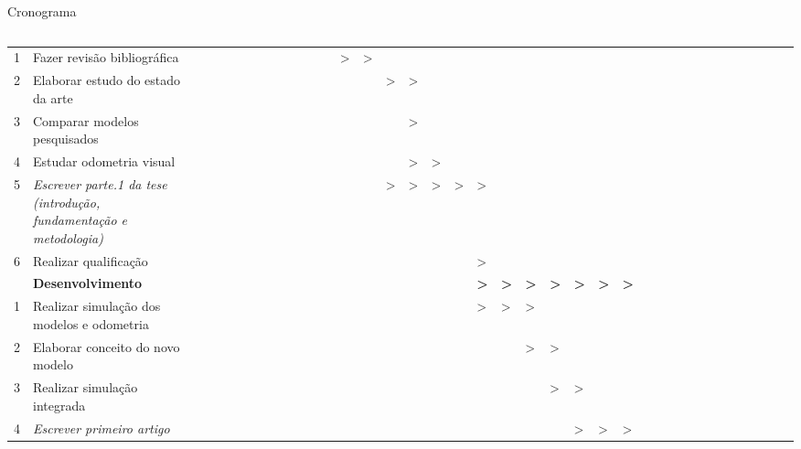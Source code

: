 \begin{frame}[c]{Cronograma}
\begin{columns}
\begin{table}[]
\begin{tabular}{llllllllllllll|llllllllllll|llllllllllll}
    1 & Fazer revisão bibliográfica &  &  &  &  &  &  &  &  &  &  &  & \textgreater{} & \textgreater{} &  &  &  &  &  &  &  &  &  &  &  &  &  &  &  &  &  &  &  &  &  &  &  \\
    2 & Elaborar estudo do estado da arte &  &  &  &  &  &  &  &  &  &  &  &  &  & \textgreater{} & \textgreater{} &  &  &  &  &  &  &  &  &  &  &  &  &  &  &  &  &  &  &  &  &  \\
    3 & Comparar modelos pesquisados &  &  &  &  &  &  &  &  &  &  &  &  &  &  & \textgreater{} &  &  &  &  &  &  &  &  &  &  &  &  &  &  &  &  &  &  &  &  &  \\
    4 & Estudar odometria visual &  &  &  &  &  &  &  &  &  &  &  &  &  &  & \textgreater{} & \textgreater{} &  &  &  &  &  &  &  &  &  &  &  &  &  &  &  &  &  &  &  &  \\
    5 & {\color[HTML]{3166FF} \textit{Escrever parte.1 da tese (introdução, fundamentação e metodologia)}} &  &  &  &  &  &  &  &  &  &  &  &  &  & \textgreater{} & \textgreater{} & \textgreater{} & \textgreater{} & \textgreater{} &  &  &  &  &  &  &  &  &  &  &  &  &  &  &  &  &  &  \\
    6 & {\color[HTML]{9A0000} Realizar qualificação} &  &  &  &  &  &  &  &  &  &  &  &  &  &  &  &  &  & \textgreater{} &  &  &  &  &  &  &  &  &  &  &  &  &  &  &  &  &  &  \\ \hline
     & \textbf{Desenvolvimento} &  &  &  &  &  &  &  &  &  &  &  &  &  &  &  &  &  & \textbf{\textgreater{}} & \textbf{\textgreater{}} & \textbf{\textgreater{}} & \textbf{\textgreater{}} & \textbf{\textgreater{}} & \textbf{\textgreater{}} & \textbf{\textgreater{}} &  &  &  &  &  &  &  &  &  &  &  &  \\ \hline
    1 & Realizar simulação dos modelos e odometria &  &  &  &  &  &  &  &  &  &  &  &  &  &  &  &  &  & \textgreater{} & \textgreater{} & \textgreater{} &  &  &  &  &  &  &  &  &  &  &  &  &  &  &  &  \\
    2 & Elaborar conceito do novo modelo &  &  &  &  &  &  &  &  &  &  &  &  &  &  &  &  &  &  &  & \textgreater{} & \textgreater{} &  &  &  &  &  &  &  &  &  &  &  &  &  &  &  \\
    3 & Realizar simulação integrada &  &  &  &  &  &  &  &  &  &  &  &  &  &  &  &  &  &  &  &  & \textgreater{} & \textgreater{} &  &  &  &  &  &  &  &  &  &  &  &  &  &  \\
    4 & {\color[HTML]{3166FF} \textit{Escrever primeiro artigo}} &  &  &  &  &  &  &  &  &  &  &  &  &  &  &  &  &  &  &  &  &  & \textgreater{} & \textgreater{} & \textgreater{} &  &  &  &  &  &  &  &  &  &  &  &  \\

\end{tabular}
\end{table}
\end{columns}
\end{frame}
